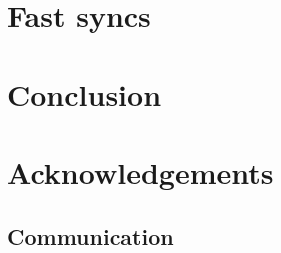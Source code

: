 \documentclass[10pt, conference, letterpaper]{IEEEtran}
\theoremstyle{nodot}
\theoremstyle{dot}
\begin{document}



\label{experiments}

\section{Fast syncs}
\label{section_syncs}


\section{Conclusion}


\section{Acknowledgements}
\label{section_acks}

\clearpage




\clearpage

\begin{appendices}
\section{Communication}
\label{appendix_comm}

\end{appendices}
\end{document}
